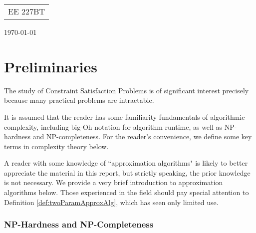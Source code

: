 \documentclass[12pt]{article}
\begin{document}
{\parindent 0pt \begin{tabular}[t]{l}
EE 227BT \\
\end{tabular}  \hfill \today \vskip 0.2in }

\parindent 0pt
\parskip 8pt

%
%
%
%
%
%
%
%
%

\section*{Preliminaries}

The study of Constraint Satisfaction Problems is of significant interest precisely because many practical problems are intractable.  

It is assumed that the reader has some familiarity fundamentals of algorithmic complexity, including big-Oh notation for algorithm runtime, as well as NP-hardness and NP-completeness. 
For the reader's convenience, we define some key terms in complexity theory below.

A reader with some knowledge of ``approximation algorithms" is likely to better appreciate the material in this report, but strictly speaking, the prior knowledge is not necessary. 
We provide a very brief introduction to approximation algorithms below. 
Those experienced in the field should pay special attention to Definition \ref{def:twoParamApproxAlg}, which has seen only limited use.

\subsubsection*{NP-Hardness and NP-Completeness}
\end{document}
